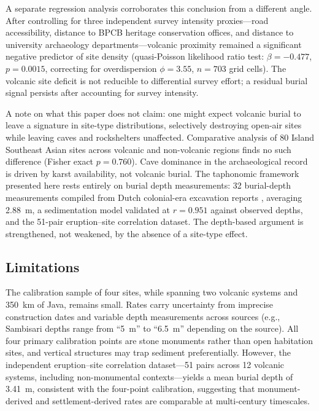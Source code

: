 \documentclass[12pt,a4paper]{article}
\begin{document}
A separate regression analysis corroborates this conclusion from a different angle. After controlling for three independent survey intensity proxies---road accessibility, distance to BPCB heritage conservation offices, and distance to university archaeology departments---volcanic proximity remained a significant negative predictor of site density (quasi-Poisson likelihood ratio test: $\beta = -0.477$, $p = 0.0015$, correcting for overdispersion $\phi = 3.55$, $n = 703$ grid cells). The volcanic site deficit is not reducible to differential survey effort; a residual burial signal persists after accounting for survey intensity.

A note on what this paper does not claim: one might expect volcanic burial to leave a signature in site-type distributions, selectively destroying open-air sites while leaving caves and rockshelters unaffected. Comparative analysis of 80 Island Southeast Asian sites across volcanic and non-volcanic regions finds no such difference (Fisher exact $p = 0.760$). Cave dominance in the archaeological record is driven by karst availability, not volcanic burial. The taphonomic framework presented here rests entirely on burial depth measurements: 32 burial-depth measurements compiled from Dutch colonial-era excavation reports \citep{ov1925}, averaging 2.88~m, a sedimentation model validated at $r = 0.951$ against observed depths, and the 51-pair eruption--site correlation dataset. The depth-based argument is strengthened, not weakened, by the absence of a site-type effect.

\subsection{Limitations}

The calibration sample of four sites, while spanning two volcanic systems and 350~km of Java, remains small. Rates carry uncertainty from imprecise construction dates and variable depth measurements across sources (e.g., Sambisari depths range from ``5~m'' to ``6.5~m'' depending on the source). All four primary calibration points are stone monuments rather than open habitation sites, and vertical structures may trap sediment preferentially. However, the independent eruption--site correlation dataset---51 pairs across 12 volcanic systems, including non-monumental contexts---yields a mean burial depth of 3.41~m, consistent with the four-point calibration, suggesting that monument-derived and settlement-derived rates are comparable at multi-century timescales.
\end{document}
